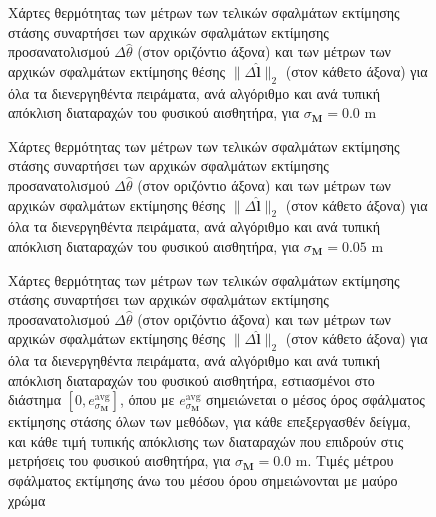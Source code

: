 \begin{figure}\vspace{1cm}\hspace{0.5cm}
  
  \vspace{1cm}
  \caption{\small Χάρτες θερμότητας των μέτρων των τελικών σφαλμάτων εκτίμησης
           στάσης συναρτήσει των αρχικών σφαλμάτων εκτίμησης προσανατολισμού
           $\Delta\hat{\theta}$ (στον οριζόντιο άξονα) και των μέτρων των
           αρχικών σφαλμάτων εκτίμησης θέσης $\|\Delta \hat{\bm{l}}\|_2$ (στον
           κάθετο άξονα) για όλα τα διενεργηθέντα πειράματα, ανά αλγόριθμο και
           ανά τυπική απόκλιση διαταραχών του φυσικού αισθητήρα, για
           $\sigma_{\bm{M}} = 0.0$ m}
  \label{fig:02_04_05:06}
\end{figure}

\begin{figure}\vspace{1cm}\hspace{0.5cm}
  
  \vspace{1cm}
  \caption{\small Χάρτες θερμότητας των μέτρων των τελικών σφαλμάτων εκτίμησης
           στάσης συναρτήσει των αρχικών σφαλμάτων εκτίμησης προσανατολισμού
           $\Delta\hat{\theta}$ (στον οριζόντιο άξονα) και των μέτρων των
           αρχικών σφαλμάτων εκτίμησης θέσης $\|\Delta \hat{\bm{l}}\|_2$ (στον
           κάθετο άξονα) για όλα τα διενεργηθέντα πειράματα, ανά αλγόριθμο και
           ανά τυπική απόκλιση διαταραχών του φυσικού αισθητήρα, για
           $\sigma_{\bm{M}} = 0.05$ m}
  \label{fig:02_04_05:07}
\end{figure}

\begin{figure}\vspace{2cm}\hspace{0.5cm}
  
  \vspace{1cm}
  \caption{\small Χάρτες θερμότητας των μέτρων των τελικών σφαλμάτων εκτίμησης
           στάσης συναρτήσει των αρχικών σφαλμάτων εκτίμησης προσανατολισμού
           $\Delta\hat{\theta}$ (στον οριζόντιο άξονα) και των μέτρων των
           αρχικών σφαλμάτων εκτίμησης θέσης $\|\Delta \hat{\bm{l}}\|_2$ (στον
           κάθετο άξονα) για όλα τα διενεργηθέντα πειράματα, ανά αλγόριθμο και
           ανά τυπική απόκλιση διαταραχών του φυσικού αισθητήρα, εστιασμένοι
           στο διάστημα $[0, e_{\sigma_{\bm{M}}}^{\text{avg}}]$, όπου με
           $e_{\sigma_{\bm{M}}}^{\text{avg}}$ σημειώνεται ο μέσος όρος
           σφάλματος εκτίμησης στάσης όλων των μεθόδων, για κάθε επεξεργασθέν
           δείγμα, και κάθε τιμή τυπικής απόκλισης των διαταραχών που επιδρούν
           στις μετρήσεις του φυσικού αισθητήρα, για $\sigma_{\bm{M}} = 0.0$ m.
           Τιμές μέτρου σφάλματος εκτίμησης άνω του μέσου όρου σημειώνονται με
           μαύρο χρώμα}
  \label{fig:02_04_05:08}
\end{figure}


